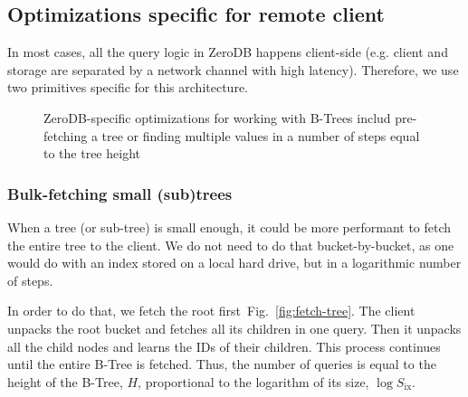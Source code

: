 \documentclass[notitlepage]{revtex4-1}
\newcommand{\figref}[1]{Fig.~\ref{#1}}
\begin{document}
\subsection{Optimizations specific for remote client}

In most cases, all the query logic in ZeroDB happens client-side (e.g. client and storage are separated by a network channel with high latency).
Therefore, we use two primitives specific for this architecture.

\begin{figure}
	\begin{center}
        \qquad
	\end{center}
    \caption{ZeroDB-specific optimizations for working with B-Trees includ pre-fetching a tree or finding multiple values in a number of steps equal to the tree height}
	\label{fig:tree-traversal-optimizations}
\end{figure}

\subsubsection{Bulk-fetching small (sub)trees}
\label{sec:bulk-fetching}

When a tree (or sub-tree) is small enough, it could be more performant to fetch the entire tree to the client.
We do not need to do that bucket-by-bucket, as one would do with an index stored on a local hard drive, but in a logarithmic number of steps.

In order to do that, we fetch the root first~\figref{fig:fetch-tree}.
The client unpacks the root bucket and fetches all its children in one query.
Then it unpacks all the child nodes and learns the IDs of their children.
This process continues until the entire B-Tree is fetched.
Thus, the number of queries is equal to the height of the B-Tree, $H$, proportional to the logarithm of its size, $\log{S_{\mbox{ix}}}$.
\end{document}
